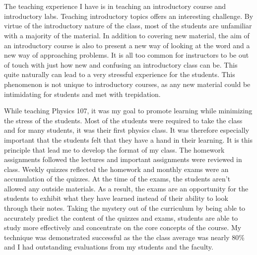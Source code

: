 {\section*{\hspace{-\parindent}\secname}
The teaching experience I have is in teaching an introductory course and introductory labs.
Teaching introductory topics offers an interesting challenge.  By virtue of the introductory nature of the class, most of the students are unfamiliar with a majority of the material.  In addition to covering new material, the aim of an introductory course is also to present a new way of looking at the word and a new way of approaching problems.  It is all too common for instructors to be out of touch with just how new and confusing an introductory class can be.  This quite naturally can lead to a very stressful experience for the students. This phenomenon is not unique to introductory courses, as any new material could be intimidating for students and met with trepidation.

While teaching Physics 107, it was my goal to promote learning while minimizing the stress of the students.  Most of the students %
were %
required to take the class %
and for many students, it was their first physics class.  It was therefore especially important that the students felt that they have a hand in their learning.  It is this principle that lead me to develop the format of my class.
The homework assignments followed the lectures and important assignments were reviewed in class. Weekly quizzes reflected the homework and monthly exams were an accumulation of the quizzes.
At the time of the exams, the students aren't allowed any outside materials. %
As a result, the exams are an opportunity for the students to exhibit what they have learned instead of their ability to look through their notes.
Taking the mystery out of the curriculum by being able to accurately predict the content of the quizzes and exams, students are able to study more effectively and 
concentrate on the core concepts of the course.
My technique was demonstrated successful as the the class average was nearly 80\% and I had outstanding evaluations from my students and the faculty.

}
